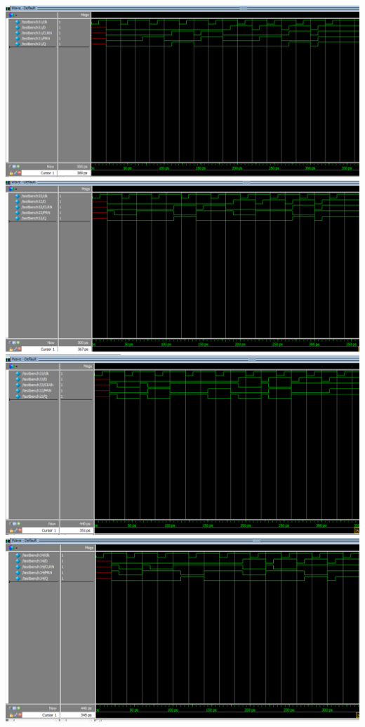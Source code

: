 \documentclass[a4paper]{jarticle}
\begin{document}
\includegraphics[width=15cm]{work13/13-m-3-1.PNG}\\
\includegraphics[width=15cm]{work13/13-m-3-2.PNG}\\
\includegraphics[width=15cm]{work13/13-m-3-3.PNG}\\
\includegraphics[width=15cm]{work13/13-m-3-4.PNG}\\
\end{document}
